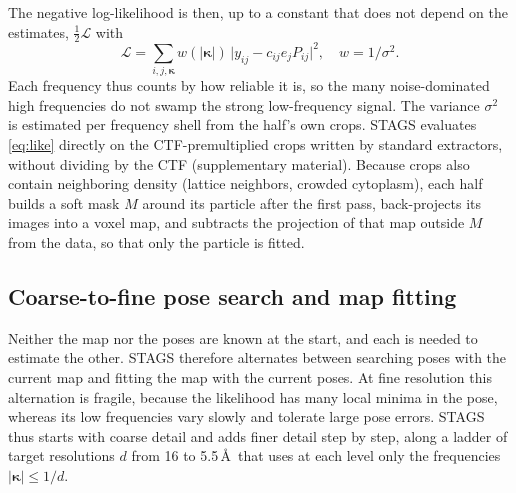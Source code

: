 The negative log-likelihood is then, up to a constant that does not depend on the estimates, $\tfrac12\mathcal{L}$ with
\begin{equation}
\mathcal{L}=\sum_{i,j,\bm{\kappa}}w(|\bm{\kappa}|)\,\big|y_{ij}-c_{ij}e_jP_{ij}\big|^2,\quad w=1/\sigma^2.
\label{eq:like}
\end{equation}
Each frequency thus counts by how reliable it is, so the many noise-dominated high frequencies do not swamp the strong low-frequency signal.
The variance $\sigma^2$ is estimated per frequency shell from the half's own crops.
STAGS evaluates \cref{eq:like} directly on the CTF-premultiplied crops written by standard extractors, without dividing by the CTF (supplementary material).%
Because crops also contain neighboring density (lattice neighbors, crowded cytoplasm), each half builds a soft mask $M$ around its particle after the first pass, back-projects its images into a voxel map, and subtracts the projection of that map outside $M$ from the data, so that only the particle is fitted.



\subsection{Coarse-to-fine pose search and map fitting}
\label{sec:method:pose}

Neither the map nor the poses are known at the start, and each is needed to estimate the other.
STAGS therefore alternates between searching poses with the current map and fitting the map with the current poses.
At fine resolution this alternation is fragile, because the likelihood has many local minima in the pose, whereas its low frequencies vary slowly and tolerate large pose errors.
STAGS thus starts with coarse detail and adds finer detail step by step, along a ladder of target resolutions $d$ from 16 to 5.5\,\AA\ that uses at each level only the frequencies $|\bm{\kappa}|\le1/d$.

